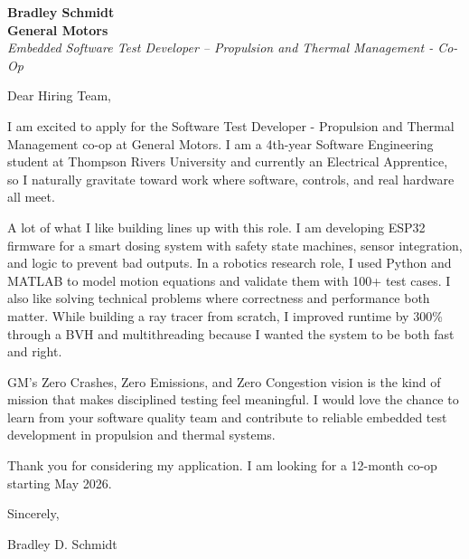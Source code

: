 \documentclass[11pt]{article}
\begin{document}
\textbf{Bradley Schmidt}\\
\vspace{0.5em}
\textbf{General Motors}\\
\textit{Embedded Software Test Developer – Propulsion and Thermal Management - Co-Op}

Dear Hiring Team,

\par

I am excited to apply for the Software Test Developer - Propulsion and Thermal Management co-op at General Motors. I am a 4th-year Software Engineering student at Thompson Rivers University and currently an Electrical Apprentice, so I naturally gravitate toward work where software, controls, and real hardware all meet.

\par

A lot of what I like building lines up with this role. I am developing ESP32 firmware for a smart dosing system with safety state machines, sensor integration, and logic to prevent bad outputs. In a robotics research role, I used Python and MATLAB to model motion equations and validate them with 100+ test cases. I also like solving technical problems where correctness and performance both matter. While building a ray tracer from scratch, I improved runtime by 300\% through a BVH and multithreading because I wanted the system to be both fast and right.

\par

GM's Zero Crashes, Zero Emissions, and Zero Congestion vision is the kind of mission that makes disciplined testing feel meaningful. I would love the chance to learn from your software quality team and contribute to reliable embedded test development in propulsion and thermal systems.

\par

Thank you for considering my application. I am looking for a 12-month co-op starting May 2026.

\par

Sincerely,

\par

Bradley D. Schmidt
\end{document}
